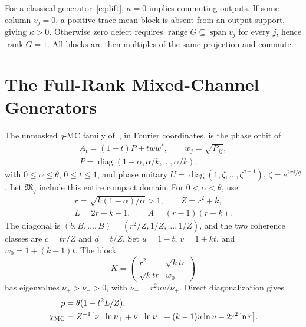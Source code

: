 \documentclass[12pt,letterpaper,onecolumn]{article}
\theoremstyle{definition}
\theoremstyle{remark}
\DeclareMathOperator{\rank}{rank}
\DeclareMathOperator{\diag}{diag}
\begin{document}
For a classical generator~\eqref{eq:lift}, \(\kappa=0\) implies commuting outputs. If some column \(v_j=0\), a positive-trace mean block is absent from an output support, giving \(\kappa>0\). Otherwise zero defect requires
\(\operatorname{range}G\subseteq\operatorname{span}v_j\) for every \(j\), hence \(\rank G=1\). All blocks are then multiples of the same projection and commute.

\section{The Full-Rank Mixed-Channel Generators}\label{sec:MC}
The unmasked \(q\)-MC family of~\cite[Sec.~7]{AG2026}, in Fourier coordinates, is the phase orbit of
\begin{equation}\label{eq:MC}
\begin{gathered}
A_t=(1-t)P+tww^*,\qquad w_j=\sqrt{P_{jj}},\\
P=\diag(1-\alpha,\alpha/k,\ldots,\alpha/k),
\end{gathered}
\end{equation}
with \(0\le\alpha\le\theta\), \(0\le t\le1\), and phase unitary
\(U=\diag(1,\zeta,\ldots,\zeta^{q-1})\), \(\zeta=e^{2\pi i/q}\).
Let \(\mathfrak M_q\) include this entire compact domain.
For \(0<\alpha<\theta\), use
\begin{gather*}
r=\sqrt{k(1-\alpha)/\alpha}>1,\qquad Z=r^2+k,\\
L=2r+k-1,\qquad A=(r-1)(r+k).
\end{gather*}
The diagonal is \((b,B,\ldots,B)=(r^2/Z,1/Z,\ldots,1/Z)\), and the two coherence classes are \(c=tr/Z\) and \(d=t/Z\).
Set \(u=1-t\), \(v=1+kt\), and \(w_0=1+(k-1)t\). The block
\[
K=\begin{pmatrix}r^2&\sqrt{k}tr\\\sqrt{k}tr&w_0\end{pmatrix}
\]
has eigenvalues \(\nu_+>\nu_->0\), with \(\nu_- = r^2uv/\nu_+\).
Direct diagonalization gives
\begin{align}
p&=\theta(1-t^2L/Z),\label{eq:MCerror}\\
\chi_{\rm MC}&=Z^{-1}\big[\nu_+\ln\nu_++\nu_-\ln\nu_-
+(k-1)u\ln u-2r^2\ln r\big].\label{eq:MCchi}
\end{align}
\end{document}
